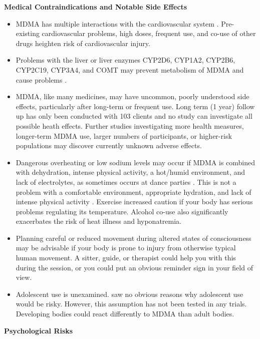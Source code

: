 \documentclass[12pt,letterpaper]{article}
\begin{document}
\noindent \textbf{Medical Contraindications and Notable Side Effects}
\begin{itemize}
    \item MDMA has multiple interactions with the cardiovascular system \cite{bonsignoreCardio}. Pre-existing cardiovascular problems, high doses, frequent use, and co-use of other drugs heighten risk of cardiovascular injury.
    \item Problems with the liver or liver enzymes CYP2D6, CYP1A2, CYP2B6, CYP2C19, CYP3A4, and COMT may prevent metabolism of MDMA and cause problems \cite{torreEnzymes}.
    \item MDMA, like many medicines, may have uncommon, poorly understood side effects, particularly after long-term or frequent use. Long term (1 year) follow up has only been conducted with 103 clients \cite{jeromeMDMALongTerm} and no study can investigate all possible heath effects. Further studies investigating more health measures, longer-term MDMA use, larger numbers of participants, or higher-risk populations may discover currently unknown adverse effects.
    \item Dangerous overheating or low sodium levels may occur if MDMA is combined with dehydration, intense physical activity, a hot/humid environment, and lack of electrolytes, as sometimes occurs at dance parties \cite{vanOverheatingAlcohol}. This is not a problem with a comfortable environment, appropriate hydration, and lack of intense physical activity \cite{mitchellMDMAClinicalTrial}. Exercise increased caution if your body has serious problems regulating its temperature. Alcohol co-use also significantly exacerbates the risk of heat illness and hyponatremia.
    \item Planning careful or reduced movement during altered states of consciousness may be advisable if your body is prone to injury from otherwise typical human movement. A sitter, guide, or therapist could help you with this during the session, or you could put an obvious reminder sign in your field of view. 
    \item Adolescent use is unexamined. \textcite{kangaslampiAdolescent} saw no obvious reasons why adolescent use would be risky. However, this assumption has not been tested in any trials. Developing bodies could react differently to MDMA than adult bodies.
\end{itemize}
\noindent \textbf{Psychological Risks}
\end{document}

